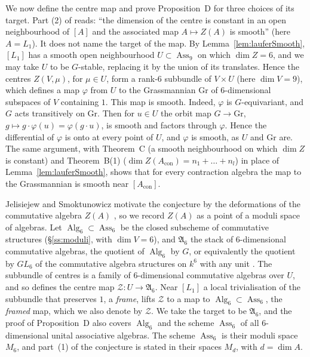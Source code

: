 \documentclass[11pt]{amsart}
\numberwithin{table}{section}
\numberwithin{figure}{section}
\numberwithin{equation}{section}
\theoremstyle{definition}
\theoremstyle{plain}
\newcommand{\Acon}{A_{\mathrm{con}}}
\newcommand{\sAlg}{\mathfrak{A}}
\DeclareMathOperator{\Alg}{Alg}
\DeclareMathOperator{\Ass}{Ass}
\begin{document}
We now define the centre map and prove Proposition~D for three choices of its target. Part (2) of \cite[Conj~1.4]{JS} reads: ``the dimension of the centre is constant in an open neighbourhood of $[A]$ and the associated map $A \mapsto Z(A)$ is smooth'' (here $A = L_1$). It does not name the target of the map. By Lemma~\ref{lem:lauferSmooth}, $[L_1]$ has a smooth open neighbourhood $U \subset \Ass_9$ on which $\dim Z = 6$, and we may take $U$ to be $G$-stable, replacing it by the union of its translates. Hence the centres $Z(V, \mu)$, for $\mu \in U$, form a rank-$6$ subbundle of $V \times U$ (here $\dim V = 9$), which defines a map $\varphi$ from $U$ to the Grassmannian $\mathrm{Gr}$ of $6$-dimensional subspaces of $V$ containing $1$. This map is smooth. Indeed, $\varphi$ is $G$-equivariant, and $G$ acts transitively on $\mathrm{Gr}$. Then for $u \in U$ the orbit map $G \to \mathrm{Gr}$, $g \mapsto g\cdot\varphi(u) = \varphi(g\cdot u)$, is smooth and factors through $\varphi$. Hence the differential of $\varphi$ is onto at every point of $U$, and $\varphi$ is smooth, as $U$ and $\mathrm{Gr}$ are. The same argument, with Theorem~C (a smooth neighbourhood on which $\dim Z$ is constant) and Theorem~B(1) ($\dim Z(\Acon) = n_1 + \dots + n_l$) in place of Lemma~\ref{lem:lauferSmooth}, shows that for every contraction algebra the map to the Grassmannian is smooth near $[\Acon]$.

Jelisiejew and Smoktunowicz motivate the conjecture by the deformations of the commutative algebra $Z(A)$ \cite[\S1]{JS}, so we record $Z(A)$ as a point of a moduli space of algebras. Let $\Alg_6 \subset \Ass_6$ be the closed subscheme of commutative structures (\S\ref{ss:moduli}, with $\dim V = 6$), and $\sAlg_6$ the stack of $6$-dimensional commutative algebras, the quotient of $\Alg_6$ by $G$, or equivalently the quotient by $GL_6$ of the commutative algebra structures on $k^6$ with any unit \cite[Prop~3.1, Def~3.2]{Poo}. The subbundle of centres is a family of $6$-dimensional commutative algebras over $U$, and so defines the centre map $\mathcal Z\colon U \to \sAlg_6$. Near $[L_1]$ a local trivialisation of the subbundle that preserves $1$, a \emph{frame}, lifts $\mathcal Z$ to a map to $\Alg_6 \subset \Ass_6$, the \emph{framed} map, which we also denote by $\mathcal Z$. We take the target to be $\sAlg_6$, and the proof of Proposition~D also covers $\Alg_6$ and the scheme $\Ass_6$ of all $6$-dimensional unital associative algebras. The scheme $\Ass_6$ is their moduli space $M_6$, and part~(1) of the conjecture is stated in their spaces $M_d$, with $d = \dim A$.
\end{document}
